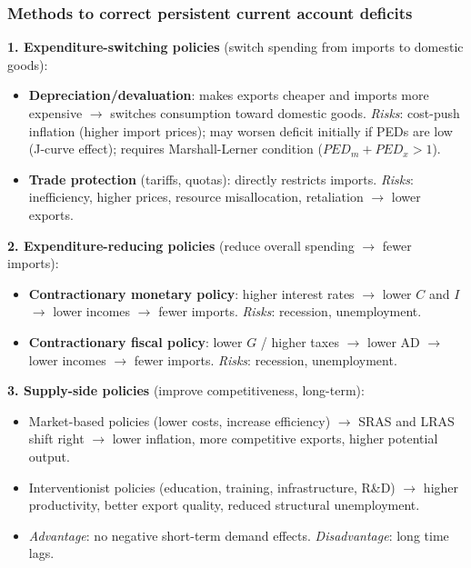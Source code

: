\documentclass[a4paper,12pt]{article}
\begin{document}
\subsubsection*{Methods to correct persistent current account deficits}
\textbf{1. Expenditure-switching policies} (switch spending from imports to domestic goods):
\begin{itemize}
  \item \textbf{Depreciation/devaluation}: makes exports cheaper and imports more expensive $\to$ switches consumption toward domestic goods. \textit{Risks}: cost-push inflation (higher import prices); may worsen deficit initially if PEDs are low (J-curve effect); requires Marshall-Lerner condition ($PED_m + PED_x > 1$).
  \item \textbf{Trade protection} (tariffs, quotas): directly restricts imports. \textit{Risks}: inefficiency, higher prices, resource misallocation, retaliation $\to$ lower exports.
\end{itemize}
\textbf{2. Expenditure-reducing policies} (reduce overall spending $\to$ fewer imports):
\begin{itemize}
  \item \textbf{Contractionary monetary policy}: higher interest rates $\to$ lower $C$ and $I$ $\to$ lower incomes $\to$ fewer imports. \textit{Risks}: recession, unemployment.
  \item \textbf{Contractionary fiscal policy}: lower $G$ / higher taxes $\to$ lower AD $\to$ lower incomes $\to$ fewer imports. \textit{Risks}: recession, unemployment.
\end{itemize}
\textbf{3. Supply-side policies} (improve competitiveness, long-term):
\begin{itemize}
  \item Market-based policies (lower costs, increase efficiency) $\to$ SRAS and LRAS shift right $\to$ lower inflation, more competitive exports, higher potential output.
  \item Interventionist policies (education, training, infrastructure, R\&D) $\to$ higher productivity, better export quality, reduced structural unemployment.
  \item \textit{Advantage}: no negative short-term demand effects. \textit{Disadvantage}: long time lags.
\end{itemize}
\end{document}

